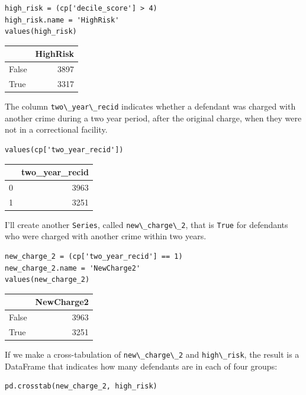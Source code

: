 \begin{lstlisting}[]
high_risk = (cp['decile_score'] > 4)
high_risk.name = 'HighRisk'
values(high_risk)
\end{lstlisting}

\begin{tabular}{lr}
\midrule
{} &  HighRisk \\
\midrule
False &      3897 \\
True  &      3317 \\
\midrule
\end{tabular}

The column \passthrough{\lstinline!two\_year\_recid!} indicates whether
a defendant was charged with another crime during a two year period,
after the original charge, when they were not in a correctional
facility.

\begin{lstlisting}[]
values(cp['two_year_recid'])
\end{lstlisting}

\begin{tabular}{lr}
\midrule
{} &  two\_year\_recid \\
\midrule
0 &            3963 \\
1 &            3251 \\
\midrule
\end{tabular}

I'll create another \passthrough{\lstinline!Series!}, called
\passthrough{\lstinline!new\_charge\_2!}, that is
\passthrough{\lstinline!True!} for defendants who were charged with
another crime within two years.

\begin{lstlisting}[]
new_charge_2 = (cp['two_year_recid'] == 1)
new_charge_2.name = 'NewCharge2'
values(new_charge_2)
\end{lstlisting}

\begin{tabular}{lr}
\midrule
{} &  NewCharge2 \\
\midrule
False &        3963 \\
True  &        3251 \\
\midrule
\end{tabular}

If we make a cross-tabulation of
\passthrough{\lstinline!new\_charge\_2!} and
\passthrough{\lstinline!high\_risk!}, the result is a DataFrame that
indicates how many defendants are in each of four groups:

\begin{lstlisting}[]
pd.crosstab(new_charge_2, high_risk)
\end{lstlisting}


